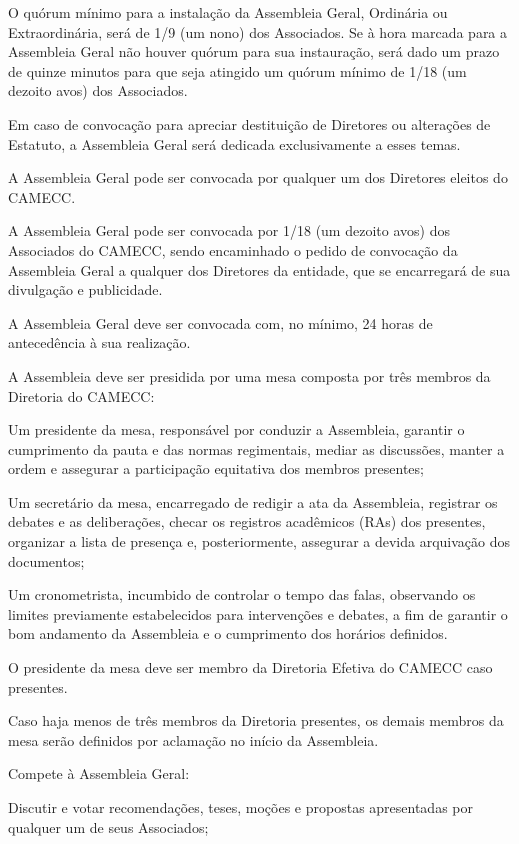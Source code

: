 \documentclass{estatuto}
\begin{document}
\artigo O quórum mínimo para a instalação da Assembleia Geral, Ordinária ou Extraordinária, será de 1/9 (um nono) dos Associados. Se à hora marcada para a Assembleia Geral não houver quórum para sua instauração, será dado um prazo de quinze minutos para que seja atingido um quórum mínimo de 1/18 (um dezoito avos) dos Associados.

\artigo Em caso de convocação para apreciar destituição de Diretores ou alterações de Estatuto, a Assembleia Geral será dedicada exclusivamente a esses temas.

\artigo A Assembleia Geral pode ser convocada por qualquer um dos Diretores eleitos do CAMECC.

\artigo A Assembleia Geral pode ser convocada por 1/18 (um dezoito avos) dos Associados do CAMECC, sendo encaminhado o pedido de convocação da Assembleia Geral a qualquer dos Diretores da entidade, que se encarregará de sua divulgação e publicidade.

\artigo A Assembleia Geral deve ser convocada com, no mínimo, 24 horas de antecedência à sua realização.

\artigo A Assembleia deve ser presidida por uma mesa composta por três membros da Diretoria do CAMECC:

\inciso Um presidente da mesa, responsável por conduzir a Assembleia, garantir o cumprimento da pauta e das normas regimentais, mediar as discussões, manter a ordem e assegurar a participação equitativa dos membros presentes;

\inciso Um secretário da mesa, encarregado de redigir a ata da Assembleia, registrar os debates e as deliberações, checar os registros acadêmicos (RAs) dos presentes, organizar a lista de presença e, posteriormente, assegurar a devida arquivação dos documentos;

\inciso Um cronometrista, incumbido de controlar o tempo das falas, observando os limites previamente estabelecidos para intervenções e debates, a fim de garantir o bom andamento da Assembleia e o cumprimento dos horários definidos.

\paragrafo O presidente da mesa deve ser membro da Diretoria Efetiva do CAMECC caso presentes.

\paragrafo Caso haja menos de três membros da Diretoria presentes, os demais membros da mesa serão definidos por aclamação no início da Assembleia.

\artigo Compete à Assembleia Geral:

\inciso Discutir e votar recomendações, teses, moções e propostas apresentadas por qualquer um de seus Associados;
\end{document}
